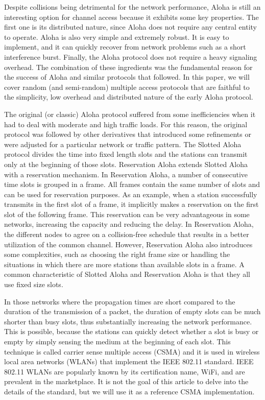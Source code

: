 \documentclass[journal]{IEEEtran}
\begin{document}
Despite collisions being detrimental for the network performance, Aloha is still an interesting option for channel access because it exhibits some key properties.
The first one is its distributed nature, since Aloha does not require any central entity to operate.
Aloha is also very simple and extremely robust.
It is easy to implement, and it can quickly recover from network problems such as a short interference burst.
Finally, the Aloha protocol does not require a heavy signaling overhead.
The combination of these ingredients was the fundamental reason for the success of Aloha and similar protocols that followed.
In this paper, we will cover random (and semi-random) multiple access protocols that are faithful to the simplicity, low overhead and distributed nature of the early Aloha protocol.


The original (or classic) Aloha protocol suffered from some inefficiencies when it had to deal with moderate and high traffic loads.
For this reason, the original protocol was followed by other derivatives that introduced some refinements or were adjusted for a particular network or traffic pattern.
The Slotted Aloha protocol divides the time into fixed length slots and the stations can transmit only at the beginning of those slots.
Reservation Aloha \cite{crowther1973sbc} extends Slotted Aloha with a reservation mechanism.
In  Reservation Aloha, a number of consecutive  time slots is grouped in a frame.
All frames contain the same number of slots and can be used for reservation purposes.
As an example, when a station successfully transmits in the first slot of a frame, it implicitly makes a reservation on the first slot of the following frame.
This reservation can be very advantageous in some networks, increasing the capacity and reducing the delay.
In Reservation Aloha, the different nodes to agree on a collision-free schedule that results in a better utilization of the common channel.
However, Reservation Aloha also introduces some complexities, such as choosing the right frame size or handling the situations in which there are more stations than available slots in a frame.
A common characteristic of Slotted Aloha and Reservation Aloha is that they all use fixed size slots.

In those networks where the propagation times are short compared to the duration of the transmission of a packet, the duration of empty slots can be much shorter than busy slots, thus substantially increasing the network performance.
This is possible, because the stations can quickly detect whether a slot is busy or empty by simply sensing the medium at the beginning of each slot.
This technique is called carrier sense multiple access (CSMA) and  it is used in wireless local area networks (WLANs) that implement the IEEE 802.11 standard.
IEEE 802.11 WLANs are popularly known by its certification name, WiFi, and are prevalent in the marketplace.
It is not the goal of this article to delve into the details of the standard, but we will use it as a reference CSMA implementation.
\end{document}
